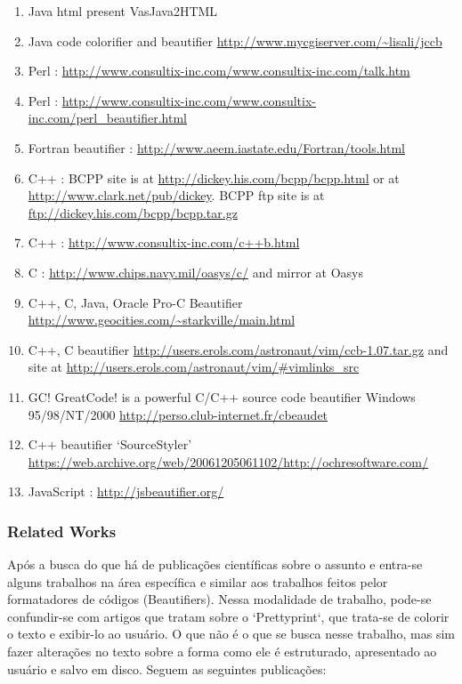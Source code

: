 \begin{englishtext}
\begin{sloppypar}
\begin{bluebox}
\begin{enumerate}[leftmargin=*,parsep=0pt]
        \item Java html present VasJava2HTML
        \item Java code colorifier and beautifier \url{http://www.mycgiserver.com/~lisali/jccb}
        \item Perl : \url{http://www.consultix-inc.com/www.consultix-inc.com/talk.htm}
        \item Perl : \url{http://www.consultix-inc.com/www.consultix-inc.com/perl_beautifier.html}
        \item Fortran beautifier : \url{http://www.aeem.iastate.edu/Fortran/tools.html}

        \item C++ : BCPP site is at \url{http://dickey.his.com/bcpp/bcpp.html} or at \url{http://www.clark.net/pub/dickey}.
        BCPP ftp site is at \url{ftp://dickey.his.com/bcpp/bcpp.tar.gz}

        \item C++ : \url{http://www.consultix-inc.com/c++b.html}
        \item C : \url{http://www.chips.navy.mil/oasys/c/} and mirror at Oasys
        \item C++, C, Java, Oracle Pro-C Beautifier \url{http://www.geocities.com/~starkville/main.html}

        \item C++, C beautifier \url{http://users.erols.com/astronaut/vim/ccb-1.07.tar.gz} and site at
        \url{http://users.erols.com/astronaut/vim/#vimlinks_src}

        \item GC! GreatCode! is a powerful C/C++ source code beautifier Windows 95/98/NT/2000
        \url{http://perso.club-internet.fr/cbeaudet}

        \item C++ beautifier `SourceStyler' \url{https://web.archive.org/web/20061205061102/http://ochresoftware.com/}
        \item JavaScript : \url{http://jsbeautifier.org/}

    \end{enumerate}
    \end{bluebox}
    \end{sloppypar}


\subsubsection{Related Works}

    Após a busca do que há de publicações científicas sobre o assunto e entra-se alguns trabalhos na
    área específica e similar aos trabalhos feitos pelor formatadores de códigos (Beautifiers).
    Nessa modalidade de trabalho, pode-se confundir-se com artigos que tratam sobre o `Prettyprint`,
    que trata-se de colorir o texto e exibir-lo ao usuário. O que não é o que se busca nesse
    trabalho, mas sim fazer alterações no texto sobre a forma como ele é estruturado, apresentado ao
    usuário e salvo em disco. Seguem as seguintes publicações:


\end{englishtext}
